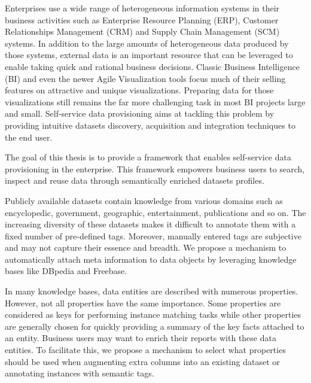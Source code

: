 Enterprises use a wide range of heterogeneous information systems in their business activities such as Enterprise Resource Planning (ERP), Customer Relationships Management (CRM) and Supply Chain Management (SCM) systems. In addition to the large amounts of heterogeneous data produced by those systems, external data is an important resource that can be leveraged to enable taking quick and rational business decisions.
Classic Business Intelligence (BI) and even the newer Agile Visualization tools focus much of their selling features on attractive and unique visualizations. Preparing data for those visualizations still remains the far more challenging task in most BI projects large and small. Self-service data provisioning aims at tackling this problem by providing intuitive datasets discovery, acquisition and integration techniques to the end user.

The goal of this thesis is to provide a framework that enables self-service data provisioning in the enterprise. This framework empowers business users to search, inspect and reuse data through semantically enriched datasets profiles.

Publicly available datasets contain knowledge from various domains such as encyclopedic, government, geographic, entertainment, publications and so on. The increasing diversity of these datasets makes it difficult to annotate them with a fixed number of pre-defined tags. Moreover, manually entered tags are subjective and may not capture their essence and breadth. We propose a mechanism to automatically attach meta information to data objects by leveraging knowledge bases like DBpedia and Freebase.

In many knowledge bases, data entities are described with numerous properties. However, not all properties have the same importance. Some properties are considered as keys for performing instance matching tasks while other properties are generally chosen for quickly providing a summary of the key facts attached to an entity.
Business users may want to enrich their reports with these data entities. To facilitate this, we propose a mechanism to select what properties should be used when augmenting extra columns into an existing dataset or annotating instances with semantic tags.

